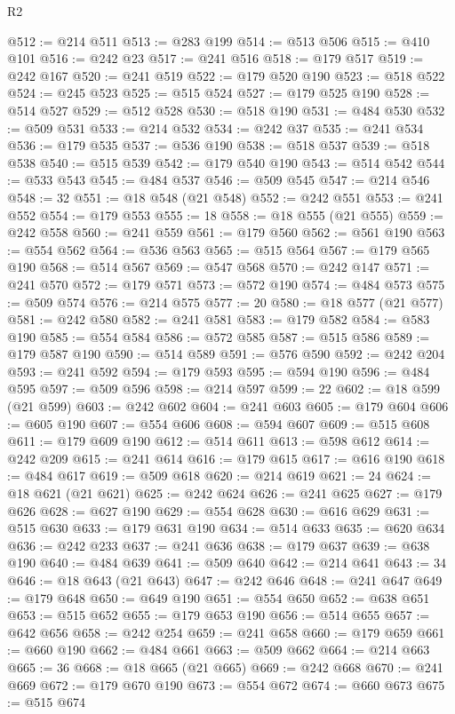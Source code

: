 \begin{lexlean}{R2}
\begin{coremodule}
@512 := @214 @511
@513 := @283 @199
@514 := @513 @506
@515 := @410 @101
@516 := @242 @23
@517 := @241 @516
@518 := @179 @517
@519 := @242 @167
@520 := @241 @519
@522 := @179 @520 @190
@523 := @518 @522
@524 := @245 @523
@525 := @515 @524
@527 := @179 @525 @190
@528 := @514 @527
@529 := @512 @528
@530 := @518 @190
@531 := @484 @530
@532 := @509 @531
@533 := @214 @532
@534 := @242 @37
@535 := @241 @534
@536 := @179 @535
@537 := @536 @190
@538 := @518 @537
@539 := @518 @538
@540 := @515 @539
@542 := @179 @540 @190
@543 := @514 @542
@544 := @533 @543
@545 := @484 @537
@546 := @509 @545
@547 := @214 @546
@548 := 32
@551 := @18 @548 (@21 @548)
@552 := @242 @551
@553 := @241 @552
@554 := @179 @553
@555 := 18
@558 := @18 @555 (@21 @555)
@559 := @242 @558
@560 := @241 @559
@561 := @179 @560
@562 := @561 @190
@563 := @554 @562
@564 := @536 @563
@565 := @515 @564
@567 := @179 @565 @190
@568 := @514 @567
@569 := @547 @568
@570 := @242 @147
@571 := @241 @570
@572 := @179 @571
@573 := @572 @190
@574 := @484 @573
@575 := @509 @574
@576 := @214 @575
@577 := 20
@580 := @18 @577 (@21 @577)
@581 := @242 @580
@582 := @241 @581
@583 := @179 @582
@584 := @583 @190
@585 := @554 @584
@586 := @572 @585
@587 := @515 @586
@589 := @179 @587 @190
@590 := @514 @589
@591 := @576 @590
@592 := @242 @204
@593 := @241 @592
@594 := @179 @593
@595 := @594 @190
@596 := @484 @595
@597 := @509 @596
@598 := @214 @597
@599 := 22
@602 := @18 @599 (@21 @599)
@603 := @242 @602
@604 := @241 @603
@605 := @179 @604
@606 := @605 @190
@607 := @554 @606
@608 := @594 @607
@609 := @515 @608
@611 := @179 @609 @190
@612 := @514 @611
@613 := @598 @612
@614 := @242 @209
@615 := @241 @614
@616 := @179 @615
@617 := @616 @190
@618 := @484 @617
@619 := @509 @618
@620 := @214 @619
@621 := 24
@624 := @18 @621 (@21 @621)
@625 := @242 @624
@626 := @241 @625
@627 := @179 @626
@628 := @627 @190
@629 := @554 @628
@630 := @616 @629
@631 := @515 @630
@633 := @179 @631 @190
@634 := @514 @633
@635 := @620 @634
@636 := @242 @233
@637 := @241 @636
@638 := @179 @637
@639 := @638 @190
@640 := @484 @639
@641 := @509 @640
@642 := @214 @641
@643 := 34
@646 := @18 @643 (@21 @643)
@647 := @242 @646
@648 := @241 @647
@649 := @179 @648
@650 := @649 @190
@651 := @554 @650
@652 := @638 @651
@653 := @515 @652
@655 := @179 @653 @190
@656 := @514 @655
@657 := @642 @656
@658 := @242 @254
@659 := @241 @658
@660 := @179 @659
@661 := @660 @190
@662 := @484 @661
@663 := @509 @662
@664 := @214 @663
@665 := 36
@668 := @18 @665 (@21 @665)
@669 := @242 @668
@670 := @241 @669
@672 := @179 @670 @190
@673 := @554 @672
@674 := @660 @673
@675 := @515 @674

\end{coremodule}
\end{lexlean}
